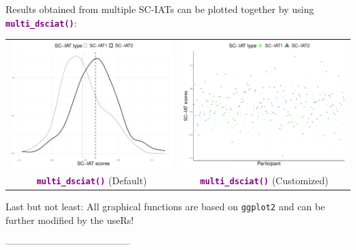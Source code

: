 \documentclass[a0,landscape]{a0poster}
\begin{document}
\begin{multicols*}{3}
Results obtained from multiple SC-IATs can be plotted together by using \textbf{\textcolor{purple}{\texttt{multi\_dsciat()}}}: 
\vspace{3mm}
		\begin{center}
		\begin{tabular}{c c}
			\includegraphics[width=0.40\linewidth]{sciatDefault.pdf}
			&
			\includegraphics[width=0.40\linewidth]{multiSciatPoints.pdf} \\
			\textbf{\textcolor{purple}{\texttt{multi\_dsciat()}}}  (Default) & \textbf{\textcolor{purple}{\texttt{multi\_dsciat()}}} (Customized) \\
		\end{tabular}
		\end{center}


\vspace{5mm}

\textcolor{title}{Last but not least:} All graphical functions are based on \texttt{ggplot2} \cite{ggplot2} and can be further modified by the useRs! 

\vspace{5mm}
---------------------------------------
\footnotesize


\end{multicols*}
\end{document}
